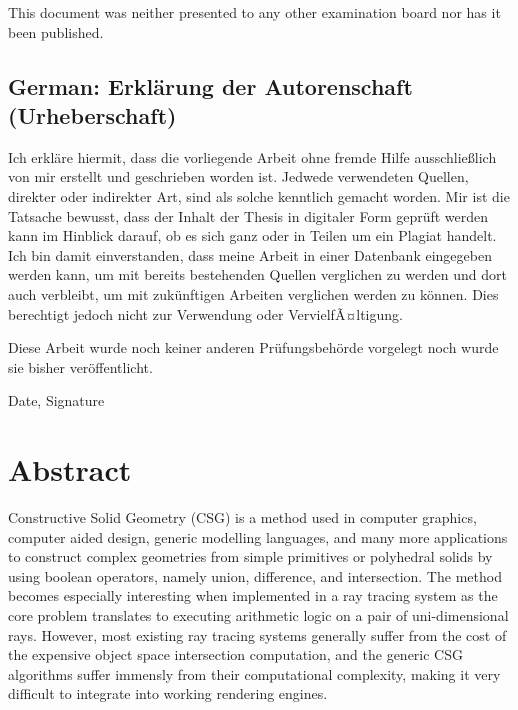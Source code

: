 \documentclass[a4paper,11pt,oneside]{article}
\begin{document}
    This document was neither presented to any other examination board
    nor has it been published.

    \subsection*{German: Erklärung der Autorenschaft (Urheberschaft)}

    Ich erkläre hiermit, dass die vorliegende Arbeit ohne fremde Hilfe
    ausschließlich von mir erstellt und geschrieben worden ist. Jedwede
    verwendeten Quellen, direkter oder indirekter Art, sind als solche
    kenntlich gemacht worden. Mir ist die Tatsache bewusst, dass der
    Inhalt der Thesis in digitaler Form geprüft werden kann im Hinblick
    darauf, ob es sich ganz oder in Teilen um ein Plagiat handelt. Ich
    bin damit einverstanden, dass meine Arbeit in einer Datenbank
    eingegeben werden kann, um mit bereits bestehenden Quellen
    verglichen zu werden und dort auch verbleibt, um mit zukünftigen
    Arbeiten verglichen werden zu können. Dies berechtigt jedoch nicht
    zur Verwendung oder VervielfÃ¤ltigung.

    Diese Arbeit wurde noch keiner anderen Prüfungsbehörde vorgelegt
    noch wurde sie bisher veröffentlicht.

    \vspace{20mm}

    Date, Signature

    \newpage

    \section*{Abstract}



    Constructive Solid Geometry (CSG) is a method used in computer graphics, computer aided design, generic modelling languages, and many more applications to construct complex geometries from simple primitives or polyhedral solids by using boolean operators, namely union, difference, and intersection. The method becomes especially interesting when implemented in a ray tracing system as the core problem translates to executing arithmetic logic on a pair of uni-dimensional rays. However, most existing ray tracing systems generally suffer from the cost of the expensive object space intersection computation, and the generic CSG algorithms suffer immensly from their computational complexity, making it very difficult to integrate into working rendering engines.
\end{document}
